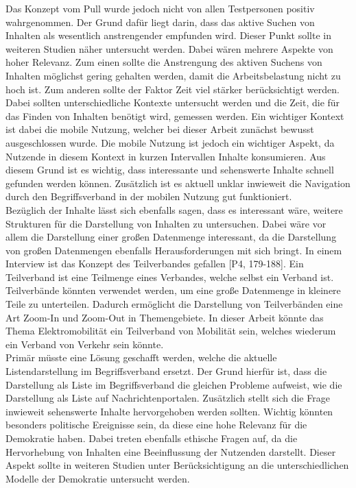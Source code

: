 Das Konzept vom Pull wurde jedoch nicht von allen Testpersonen positiv wahrgenommen.
Der Grund dafür liegt darin, dass das aktive Suchen von Inhalten als wesentlich anstrengender empfunden wird.
Dieser Punkt sollte in weiteren Studien näher untersucht werden.
Dabei wären mehrere Aspekte von hoher Relevanz.
Zum einen sollte die Anstrengung des aktiven Suchens von Inhalten möglichst gering gehalten werden, damit die Arbeitsbelastung nicht zu hoch ist.
Zum anderen sollte der Faktor Zeit viel stärker berücksichtigt werden.
Dabei sollten unterschiedliche Kontexte untersucht werden und die Zeit, die für das Finden von Inhalten benötigt wird, gemessen werden.
Ein wichtiger Kontext ist dabei die mobile Nutzung, welcher bei dieser Arbeit zunächst bewusst ausgeschlossen wurde.
Die mobile Nutzung ist jedoch ein wichtiger Aspekt, da Nutzende in diesem Kontext in kurzen Intervallen Inhalte konsumieren.
Aus diesem Grund ist es wichtig, dass interessante und sehenswerte Inhalte schnell gefunden werden können.
Zusätzlich ist es aktuell unklar inwieweit die Navigation durch den Begriffsverband in der mobilen Nutzung gut funktioniert.\\

Bezüglich der Inhalte lässt sich ebenfalls sagen, dass es interessant wäre, weitere Strukturen für die Darstellung von Inhalten zu untersuchen.
Dabei wäre vor allem die Darstellung einer großen Datenmenge interessant, da die Darstellung von großen Datenmengen ebenfalls Herausforderungen mit sich bringt.
In einem Interview ist das Konzept des Teilverbandes gefallen [P4, 179-188].
Ein Teilverband ist eine Teilmenge eines Verbandes, welche selbst ein Verband ist.
Teilverbände könnten verwendet werden, um eine große Datenmenge in kleinere Teile zu unterteilen.
Dadurch ermöglicht die Darstellung von Teilverbänden eine Art Zoom-In und Zoom-Out in Themengebiete.
In dieser Arbeit könnte das Thema Elektromobilität ein Teilverband von Mobilität sein, welches wiederum ein Verband von Verkehr sein könnte. \\

Primär müsste eine Lösung geschafft werden, welche die aktuelle Listendarstellung im Begriffsverband ersetzt.
Der Grund hierfür ist, dass die Darstellung als Liste im Begriffsverband die gleichen Probleme aufweist, wie die Darstellung als Liste auf Nachrichtenportalen.
Zusätzlich stellt sich die Frage inwieweit sehenswerte Inhalte hervorgehoben werden sollten.
Wichtig könnten besonders politische Ereignisse sein, da diese eine hohe Relevanz für die Demokratie haben.
Dabei treten ebenfalls ethische Fragen auf, da die Hervorhebung von Inhalten eine Beeinflussung der Nutzenden darstellt.
Dieser Aspekt sollte in weiteren Studien unter Berücksichtigung an die unterschiedlichen Modelle der Demokratie untersucht werden.\\

